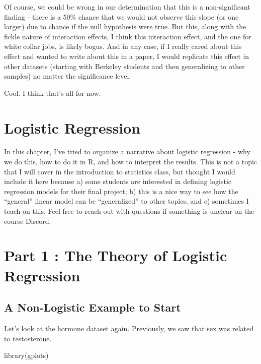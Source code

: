 \documentclass[
  letterpaper,
  DIV=11,
  numbers=noendperiod,
  oneside]{scrreprt}
\newenvironment{Shaded}{\begin{snugshade}}{\end{snugshade}}
\newcommand{\FunctionTok}[1]{\textcolor[rgb]{0.28,0.35,0.67}{#1}}
\newcommand{\NormalTok}[1]{\textcolor[rgb]{0.00,0.23,0.31}{#1}}
\begin{document}
Of course, we could be wrong in our determination that this is a
non-significant finding - there is a 50\% chance that we would not
observe this slope (or one larger) due to chance if the null hypothesis
were true. But this, along with the fickle nature of interaction
effects, I think this interaction effect, and the one for white collar
jobs, is likely bogus. And in any case, if I really cared about this
effect and wanted to write about this in a paper, I would replicate this
effect in other datasets (starting with Berkeley students and then
generalizing to other samples) no matter the significance level.

Cool. I think that's all for now.

\chapter{Logistic Regression}\label{logistic-regression}

In this chapter, I've tried to organize a narrative about logistic
regression - why we do this, how to do it in R, and how to interpret the
results. This is not a topic that I will cover in the introduction to
statistics class, but thought I would include it here because a) some
students are interested in defining logistic regression models for their
final project; b) this is a nice way to see how the ``general'' linear
model can be ``generalized'' to other topics, and c) sometimes I teach
on this. Feel free to reach out with questions if something is unclear
on the course Discord.

\chapter{Part 1 : The Theory of Logistic
Regression}\label{part-1-the-theory-of-logistic-regression}

\section{A Non-Logistic Example to
Start}\label{a-non-logistic-example-to-start}

Let's look at the hormone dataset again. Previously, we saw that sex was
related to testosterone.

\begin{Shaded}
\begin{Highlighting}[]
\FunctionTok{library}\NormalTok{(gplots)}
\end{Highlighting}
\end{Shaded}
\end{document}

